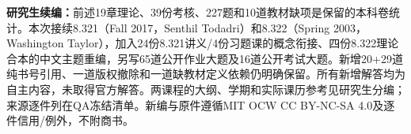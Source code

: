\noindent\textbf{研究生续编：}前述19章理论、39份考核、227题和10道教材缺项是保留的本科卷统计。本次接续8.321（Fall 2017，Senthil Todadri）和8.322（Spring 2003，Washington Taylor），加入24份8.321讲义/4份习题课的概念衔接、四份8.322理论合本的中文主题重编，另写65道公开作业大题及16道公开考试大题。新增20+29道纯书号引用、一道版权撤除和一道缺教材定义依赖仍明确保留。所有新增解答均为自主内容，未取得官方解答。两课程的大纲、学期和实际课历参考见研究生分编；来源逐件列在QA冻结清单。新编与原件遵循MIT OCW CC BY-NC-SA 4.0及逐件信用/例外，不附商书。
